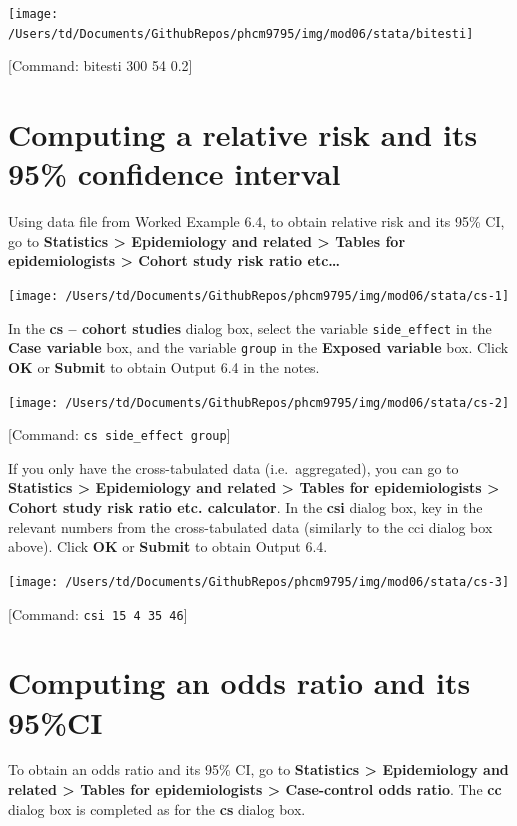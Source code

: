 \documentclass[
]{memoir}
\begin{document}
\texttt{[image: /Users/td/Documents/GithubRepos/phcm9795/img/mod06/stata/bitesti]}

{[}Command: bitesti 300 54 0.2{]}

\hypertarget{computing-a-relative-risk-and-its-95-confidence-interval}{%
\section{Computing a relative risk and its 95\% confidence interval}\label{computing-a-relative-risk-and-its-95-confidence-interval}}

Using data file from Worked Example 6.4, to obtain relative risk and its 95\% CI, go to \textbf{Statistics \textgreater{} Epidemiology and related \textgreater{} Tables for epidemiologists \textgreater{} Cohort study risk ratio etc\ldots{}}

\texttt{[image: /Users/td/Documents/GithubRepos/phcm9795/img/mod06/stata/cs-1]}

In the \textbf{cs -- cohort studies} dialog box, select the variable \texttt{side\_effect} in the \textbf{Case variable} box, and the variable \texttt{group} in the \textbf{Exposed variable} box. Click \textbf{OK} or \textbf{Submit} to obtain Output 6.4 in the notes.

\texttt{[image: /Users/td/Documents/GithubRepos/phcm9795/img/mod06/stata/cs-2]}

{[}Command: \texttt{cs\ side\_effect\ group}{]}

If you only have the cross-tabulated data (i.e.~aggregated), you can go to \textbf{Statistics \textgreater{} Epidemiology and related \textgreater{} Tables for epidemiologists \textgreater{} Cohort study risk ratio etc. calculator}. In the \textbf{csi} dialog box, key in the relevant numbers from the cross-tabulated data (similarly to the cci dialog box above). Click \textbf{OK} or \textbf{Submit} to obtain Output 6.4.

\texttt{[image: /Users/td/Documents/GithubRepos/phcm9795/img/mod06/stata/cs-3]}

{[}Command: \texttt{csi\ 15\ 4\ 35\ 46}{]}

\hypertarget{computing-an-odds-ratio-and-its-95ci}{%
\section{Computing an odds ratio and its 95\%CI}\label{computing-an-odds-ratio-and-its-95ci}}

To obtain an odds ratio and its 95\% CI, go to \textbf{Statistics \textgreater{} Epidemiology and related \textgreater{} Tables for epidemiologists \textgreater{} Case-control odds ratio}. The \textbf{cc} dialog box is completed as for the \textbf{cs} dialog box.
\end{document}
